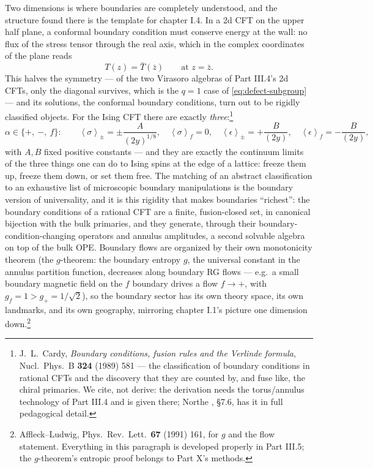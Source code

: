 Two dimensions is where boundaries are completely understood, and the
structure found there is the template for chapter I.4. In a 2d CFT on
the upper half plane, a conformal boundary condition must conserve
energy at the wall: no flux of the stress tensor through the real
axis, which in the complex coordinates of the plane reads
\begin{equation}
T(z) = \bar T(\bar z) \qquad \text{at } z = \bar z .
\label{eq:gluing}
\end{equation}
This  halves the symmetry --- of the two
Virasoro algebras of Part III.4's 2d CFTs, only the diagonal survives,
which is the $q=1$ case of \eqref{eq:defect-subgroup} --- and its
solutions, the conformal boundary conditions, turn out to be rigidly
classified objects. For the Ising CFT there are exactly
\emph{three}:\footnote{J.~L.~Cardy, \emph{Boundary conditions, fusion
rules and the Verlinde formula}, Nucl.\ Phys.\ B \textbf{324} (1989)
581 --- the classification of boundary conditions in rational CFTs and
the discovery that they are counted by, and fuse like, the chiral
primaries. We cite, not derive: the derivation needs the torus/annulus
technology of Part III.4 and is given there; Northe
, \S7.6, has it in full pedagogical detail.}
\begin{equation}
\alpha \in \{+,\ -,\ f\}:
\qquad
\left\langle \sigma \right\rangle_\pm = \pm\frac{A}{(2y)^{1/8}},
\quad
\left\langle \sigma \right\rangle_f = 0,
\quad
\left\langle \epsilon \right\rangle_\pm = +\frac{B}{(2y)},
\quad
\left\langle \epsilon \right\rangle_f = -\frac{B}{(2y)},
\label{eq:ising-boundaries}
\end{equation}
with $A, B$ fixed positive constants --- and they are exactly the
continuum limits of the three things one can do to Ising spins at the
edge of a lattice: freeze them up, freeze them down, or set them free.
The matching of an abstract classification to an exhaustive list of
microscopic boundary manipulations is the boundary version of
universality, and it is this rigidity that makes boundaries
``richest'': the boundary conditions of a rational CFT are a finite,
fusion-closed set, in canonical bijection with the bulk primaries, and
they generate, through their boundary-condition-changing operators and
annulus amplitudes, a second solvable algebra on top of the bulk OPE.
Boundary flows are organized by their own monotonicity theorem (the
$g$-theorem: the boundary entropy $g$, the universal constant in the
annulus partition function, decreases along boundary RG flows ---
e.g.\ a small boundary magnetic field on the $f$ boundary drives a
flow $f \to +$, with $g_f = 1 > g_+ = 1/\sqrt2$), so the boundary
sector has its own theory space, its own landmarks, and its own
geography, mirroring chapter I.1's picture one dimension
down.\footnote{Affleck--Ludwig, Phys.\ Rev.\ Lett.\ \textbf{67} (1991)
161, for $g$ and the flow statement. Everything in this paragraph is
developed properly in Part III.5; the $g$-theorem's entropic proof
belongs to Part X's methods.}

